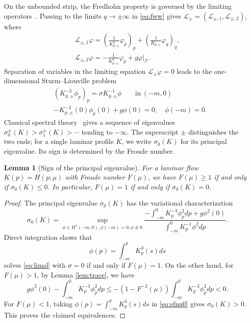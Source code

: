 \documentclass[12pt,letterpaper]{amsart}
\newtheorem{lemma}[theorem]{Lemma}
\numberwithin{equation}{section}
\begin{document}
	
	{On the unbounded strip, the Fredholm property is governed by the limiting operators~\cite{vol}. Passing to the limits $q\to\pm\infty$ in \eqref{eq:fww} gives $\mathscr L_\pm=(\mathscr L_{\pm,1},\mathscr L_{\pm,2})$, where}
	\begin{equation*}
		\begin{aligned}
		{\mathscr L_{\pm,1}}\varphi=\left(\frac{1}{K_{p,\pm}^3}\varphi_p\right)_p+\left(\frac{1}{K_{p,\pm}}\varphi_q\right)_q,\\
		{\mathscr L_{\pm,2}}\varphi=-\frac{1}{K_{p,\pm}^3}\varphi_p+g\varphi\bigg|_{\mathcal T}.
		\end{aligned}
	\end{equation*}
	{Separation of variables in the limiting equation $\mathscr L_\pm\varphi=0$ leads to the one-dimensional Sturm--Liouville problem}
	\begin{equation}\label{eq:limsl}
		\begin{aligned}
			&(K_{p,\pm}^{-3}\phi_p)_p=\sigma K_{p,\pm}^{-1}\phi\qquad\mathrm{in~}(-m,0)\\
			&-K_{p,\pm}^{-3}(0)\phi_p(0)+g\phi(0)=0,\quad\phi(-m)=0.
		\end{aligned}
	\end{equation}
	{Classical spectral theory~\cite{laxbook} gives a sequence of eigenvalues $\sigma_0^\pm(K)>\sigma_1^\pm(K)>\cdots$ tending to $-\infty$. The superscript $\pm$ distinguishes the two ends; for a single laminar profile $K$, we write $\sigma_0(K)$ for its principal eigenvalue. Its sign is determined by the Froude number.}
	
	\begin{lemma}[{Sign of the principal eigenvalue}]
	 {For a laminar flow $K(p)=H(p;\mu)$ with Froude number $F(\mu)$, we have $F(\mu)\geq1$ if and only if $\sigma_0(K)\leq0$. In particular, $F(\mu)=1$ if and only if $\sigma_0(K)=0$.}
	\end{lemma}
	\begin{proof}
	{The principal eigenvalue $\sigma_0(K)$ has the variational characterization}
	\begin{equation}\label{eq:efnu0}
		\sigma_0(K)=\sup_{\phi\in H^1(-m,0),\phi(-m)=0,\phi\not\equiv0}\frac{-\int_{-m}^0K_p^{-3}\phi_p^2dp+g\phi^2(0)}{\int_{-m}^0K_p^{-1}\phi^2dp}.
	\end{equation}
	{Direct integration shows that}
	\[\phi(p)=\int_{-m}^p K_p^3(s)ds\]
	solves \eqref{eq:limsl} with $\sigma=0$ if and only if $F(\mu)=1$. On the other hand, for $F(\mu)>1$,  by Lemma \ref{lem:trace}, we have
		\begin{equation*}
			g\phi^2(0)-\int_{-m}^0K_p^{-3}\phi_p^2dp\leq-(1-F^{-2}(\mu))\int_{-m}^0K_p^{-3}\phi_p^2dp<0.
		\end{equation*}
		For $F(\mu)<1$, taking $\phi(p)=\int_{-m}^pK_p^3(s)ds$ in \eqref{eq:efnu0} gives $\sigma_0(K)>0$.
		{This proves the claimed equivalences.}
		\end{proof}
	
\end{document}

